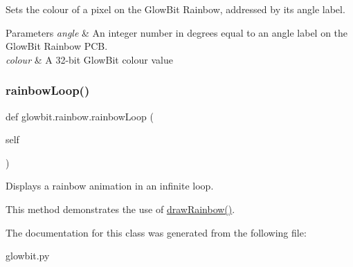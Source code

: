 Sets the colour of a pixel on the Glow\+Bit Rainbow, addressed by its angle label. 


\begin{DoxyParams}{Parameters}
{\em angle} & An integer number in degrees equal to an angle label on the Glow\+Bit Rainbow P\+CB. \\
\hline
{\em colour} & A 32-\/bit Glow\+Bit colour value \\
\hline
\end{DoxyParams}
\mbox{\label{classglowbit_1_1rainbow_a0699f7cc630c57d49c78e93504d3c878}} 
\subsubsection{\texorpdfstring{rainbow\+Loop()}{rainbowLoop()}}
{\footnotesize\ttfamily def glowbit.\+rainbow.\+rainbow\+Loop (\begin{DoxyParamCaption}\item[{}]{self }\end{DoxyParamCaption})}



Displays a rainbow animation in an infinite loop. 

This method demonstrates the use of \hyperlink{classglowbit_1_1rainbow_af03e480ce6a5d27780268b242a3fdfa7}{draw\+Rainbow()}. 

The documentation for this class was generated from the following file\+:\begin{DoxyCompactItemize}
\item 
glowbit.\+py\end{DoxyCompactItemize}
